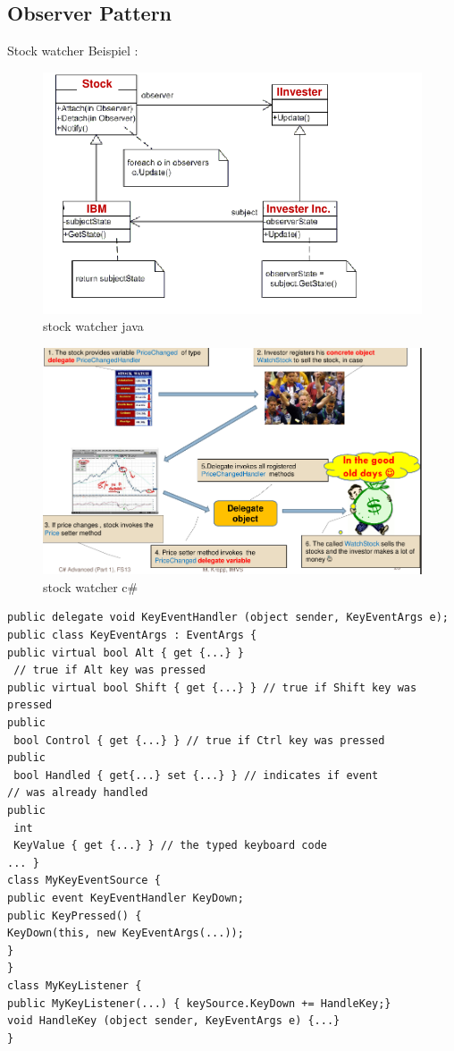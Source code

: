 \documentclass[a4paper,10pt]{scrartcl}
\begin{document}
\subsection{Observer Pattern}
Stock watcher Beispiel :
\begin{figure}[h]
 \centering
 \includegraphics[scale=0.5]{./swatcher1.png}
 \caption{stock watcher java}
\end{figure}
\begin{figure}[h]
 \centering
 \includegraphics[scale=0.5]{./swatcher2.png}
 \caption{stock watcher c\#}
\end{figure}
\pagebreak
\begin{lstlisting}[caption=KeyHandler Beispiel]
public delegate void KeyEventHandler (object sender, KeyEventArgs e);
public class KeyEventArgs : EventArgs {
public virtual bool Alt { get {...} }
 // true if Alt key was pressed
public virtual bool Shift { get {...} } // true if Shift key was pressed
public
 bool Control { get {...} } // true if Ctrl key was pressed
public
 bool Handled { get{...} set {...} } // indicates if event
// was already handled
public
 int
 KeyValue { get {...} } // the typed keyboard code
... }
class MyKeyEventSource {
public event KeyEventHandler KeyDown;
public KeyPressed() {
KeyDown(this, new KeyEventArgs(...));
}
}
class MyKeyListener {
public MyKeyListener(...) { keySource.KeyDown += HandleKey;}
void HandleKey (object sender, KeyEventArgs e) {...}
}

 
\end{lstlisting}
\end{document}
